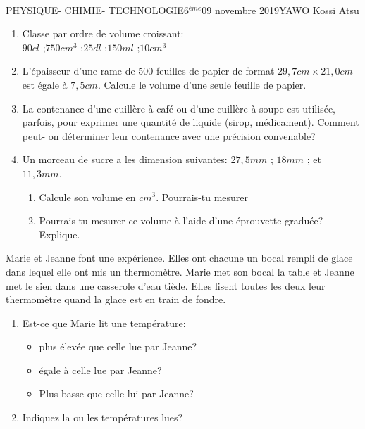 \documentclass[12pt,a4paper]{book}
\newcommand{\prof}{YAWO Kossi Atsu}
\newcommand{\matiere}{\\PHYSIQUE- CHIMIE- TECHNOLOGIE}
\newcommand{\classe}{6$^{ème}$}
\begin{document}
\begin{td}{\matiere}{\classe}{09 novembre 2019}{\prof}
\vspace{0.5cm}
\begin{exo}
\begin{enumerate}
\item Classe par ordre de volume croissant:\\
$90cl$ \qquad ;\qquad $750 cm^3$ \qquad ;\qquad $25dl$ \qquad ;\qquad $150ml$ \qquad ;\qquad $10cm^3$ 
\item L'épaisseur d'une rame de 500 feuilles de papier de format $29,7 cm\times 21,0cm$ est égale à $7,5cm$. Calcule le volume d'une seule feuille de papier.
\item La contenance d'une cuillère à café ou d'une cuillère à soupe est utilisée, parfois, pour exprimer une quantité de liquide (sirop, médicament). Comment peut- on déterminer leur contenance avec une précision convenable?
\item Un morceau de sucre a les dimension suivantes: $27,5 mm$ \qquad ; \qquad $18 mm$ \qquad ; \qquad et $11,3mm$. 
\begin{enumerate}
\item Calcule son volume en $cm^3$. Pourrais-tu mesurer
\item Pourrais-tu mesurer ce volume à l'aide d'une éprouvette graduée? Explique.
\end{enumerate} 
\end{enumerate}
\end{exo}

\vspace{0.5cm}
\begin{exo}
Marie et Jeanne font une expérience. Elles ont chacune un bocal rempli de glace dans lequel elle ont mis un thermomètre. Marie met son bocal la table et Jeanne met le sien dans une casserole d'eau tiède. Elles lisent toutes les deux leur thermomètre quand la glace est en train de fondre.
\begin{enumerate}
\item Est-ce que Marie lit une température:
\begin{itemize}
\item plus élevée que celle lue par Jeanne?
\item égale à celle lue par Jeanne?
\item Plus basse que celle lui par Jeanne?
\end{itemize}
\item Indiquez la ou les températures lues?
\end{enumerate}
\end{exo}


\end{td}
\end{document}
